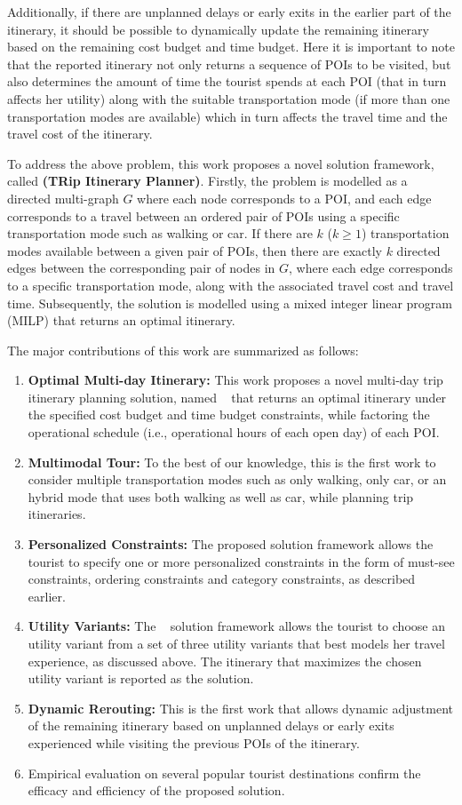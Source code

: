 Additionally, if there are unplanned delays or early exits in the earlier part of the itinerary, it should be possible to dynamically update the remaining itinerary based on the remaining cost budget and time budget. Here it is important to note that the reported itinerary not only returns a sequence of POIs to be visited, but also determines the amount of time the tourist spends at each POI (that in turn affects her utility) along with the suitable transportation mode (if more than one transportation modes are available) which in turn affects the travel time and the travel cost of the itinerary.

To address the above problem, this work proposes a novel solution framework,  called \textbf{\trip (TRip Itinerary Planner)}.  Firstly, the problem is modelled as a directed multi-graph $G$ where each node corresponds to a POI, and each edge corresponds to a travel between an ordered pair of POIs using a specific transportation mode such as walking or car. If there are $k$ ($k \ge 1$) transportation modes available between a given pair of POIs, then there are exactly $k$ directed edges between the corresponding pair of nodes in $G$, where each edge corresponds to a specific transportation mode, along with the associated travel cost and travel time. Subsequently, the solution is modelled using a mixed integer linear program (MILP) that returns an optimal itinerary.

The major contributions of this work are summarized as follows:
%
\begin{enumerate}
\item \textbf{Optimal Multi-day Itinerary:} This work proposes a novel multi-day trip itinerary planning solution, named \trip~ that returns an optimal itinerary under the specified cost budget and time budget constraints, while factoring the operational schedule (i.e., operational hours of each open day) of each POI.
\item \textbf{Multimodal Tour:} To the best of our knowledge, this is the first work to consider multiple transportation modes such as only walking, only car, or an hybrid mode that uses both walking as well as car, while planning trip itineraries.
\item \textbf{Personalized Constraints:} The proposed solution framework allows the tourist to specify one or more personalized constraints in the form of must-see constraints, ordering constraints and category constraints, as described earlier.
\item \textbf{Utility Variants:} The \trip~ solution framework allows the tourist to choose an utility variant from a set of three utility variants that best models her travel experience, as discussed above. The itinerary that maximizes the chosen utility variant is reported as the solution.
\item \textbf{Dynamic Rerouting:} This is the first work that allows dynamic adjustment of the remaining itinerary based on unplanned delays or early exits experienced while visiting the previous POIs of the itinerary.
\item Empirical evaluation on several popular tourist destinations confirm the efficacy and efficiency of the proposed solution. 
%
\end{enumerate}
